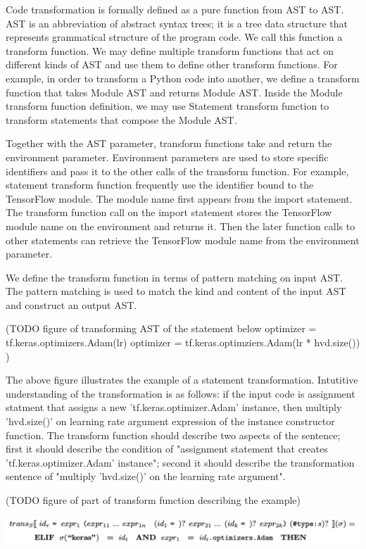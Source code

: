 Code transformation is formally defined as a pure function from AST to AST.
AST is an abbreviation of abstract syntax trees; it is a tree data structure
that represents grammatical structure of the program code.
We call this function a transform function.
We may define multiple transform functions that act on different kinds
of AST and use them to define other transform functions.
For example, in order to transform a Python code into another,
we define a transform function that takes Module AST and returns Module AST.
Inside the Module transform function definition,
we may use Statement transform function to transform statements
that compose the Module AST.

Together with the AST parameter, transform functions take and return
the environment parameter.
Environment parameters are used to store specific identifiers
and pass it to the other calls of the transform function.
For example, statement transform function frequently use 
the identifier bound to the TensorFlow module.
The module name first appears from the import statement.
The transform function call on the import statement stores
the TensorFlow module name on the environment and returns it.
Then the later function calls to other statements can
retrieve the TensorFlow module name from the environment parameter.

We define the transform function in terms of pattern matching on input AST.
The pattern matching is used to match the kind and content of the input AST
and construct an output AST.

(TODO figure of transforming AST of the statement below
optimizer = tf.keras.optimizers.Adam(lr)
optimizer = tf.keras.optimziers.Adam(lr * hvd.size())
)

The above figure illustrates the example of a statement transformation.
Intutitive understanding of the transformation is as follows:
if the input code is assignment statment 
that assigns a new 'tf.keras.optimizer.Adam' instance,
then multiply 'hvd.size()' on learning rate argument expression of the
instance constructor function.
The transform function should describe two aspects of the sentence;
first it should describe the condition of "assignment statement that
creates 'tf.keras.optimizer.Adam' instance";
second it should describe the transformation sentence
of "multiply 'hvd.size()' on the learning rate argument". 

(TODO figure of part of transform function describing the example) 

\includegraphics[width=15cm]{trans_ex01}

